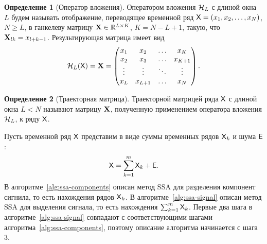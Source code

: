\documentclass[specialist,
  substylefile=spbu.rtx,
subf,href,colorlinks=true, 12pt]{disser}
\theoremstyle{plain}
\theoremstyle{definition}
\newtheorem{definition}{Определение}[section]
\theoremstyle{remark}
\begin{document}
\begin{definition}[Оператор вложения]
  \label{def:injection-op}
  Оператором вложения $\mathcal{H}_L$ с длиной окна $L$ будем называть отображение, переводящее временной ряд
  $\mathsf{X}=(x_1, x_2,\ldots, x_N)$, $N \geqslant L$, в ганкелеву матрицу $\mathbf{X}\in \mathbb{R}^{L \times K}$, $K = N-L+1$,
  такую, что $\mathbf{X}_{lk}=x_{l+k-1}$.
  Результирующая матрица имеет вид
  \[
    \mathcal{H}_L(\mathsf{X}) = \mathbf{X} =
    \begin{pmatrix}
      x_1    & x_2     & \ldots & x_K     \\
      x_2    & x_3     & \ldots & x_{K+1} \\
      \vdots & \vdots  & \ddots & \vdots  \\
      x_L    & x_{L+1} & \ldots & x_N
    \end{pmatrix}.
  \]
\end{definition}

\begin{definition}[Траекторная матрица]
  Траекторной матрицей ряда $\mathsf{X}$ с длиной окна $L<N$ называют матрицу $\mathbf{X}$, полученную применением оператора
  вложения $\mathcal{H}_L$, к ряду $\mathsf{X}$.
\end{definition}

Пусть временной ряд $\mathsf{X}$ представим в виде суммы временных рядов $\mathsf{X}_k$ и шума $\mathsf{E}$:
\[
  \mathsf{X} = \sum_{k=1}^{m} \mathsf{X}_k + \mathsf{E}.
\]
В алгоритме~\ref{alg:ssa-components} описан метод SSA для разделения компонент сигнила, то есть
нахождения рядов $\mathsf{X}_k$.
В алгоритме~\ref{alg:ssa-signal} описан метод SSA для выделения сигнала, то есть нахождения $\sum_{k=1}^{m} \mathsf{X}_k$.
Первые два шага в алгоритме~\ref{alg:ssa-signal} совпадают с соответствующими шагами
алгоритма~\ref{alg:ssa-components}, поэтому описание алгоритма начинается с шага 3.
\end{document}
